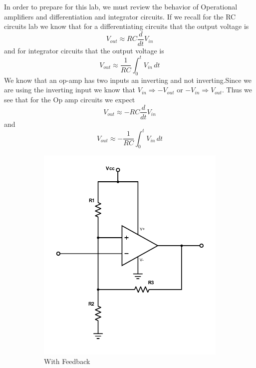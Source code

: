 \documentclass[11pt,letterpaper,onecolumn]{article}
\begin{document}
 In order to prepare for this lab, we must review the behavior of Operational amplifiers and differentiation and integrator circuits. If we recall for the RC circuits lab we know that for a differentiating circuits that the output voltage is
$$V_{out} \approx RC\frac{d}{dt}V_{in}$$
and for integrator circuits that the output voltage is
$$V_{out} \approx \frac{1}{RC}\int^t_0 V_{in}\,dt$$
We know that an op-amp has two inputs an inverting and not inverting.Since we are using the inverting input we know that $V_{in} \Rightarrow -V_{out}$ or $-V_{in} \Rightarrow V_{out}$. Thus we see that for the Op amp circuits we expect
$$V_{out} \approx -RC\frac{d}{dt}V_{in}$$
and
$$V_{out} \approx -\frac{1}{RC}\int^t_0 V_{in}\,dt$$

\begin{figure}[H]
\begin{subfigure}{.5\textwidth}
  \centering
  \includegraphics[scale =.6]{Lab-10-w-feedback.pdf}
  \caption{With Feedback}
  \label{fig:sub1}
\end{subfigure}%
\begin{subfigure}{.5\textwidth}
  \centering

\end{subfigure}
\end{figure}
\end{document}
